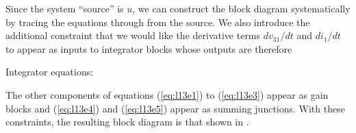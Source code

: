 \begin{slide}\label{slides:l13s1}
\begin{center}
\end{center}
\end{slide}


\ifslidesonly
\begin{slide}\label{opteq:l13e1a}

\end{slide}
\fi


Since the system ``source'' is $u$, we can construct the block diagram
systematically by tracing the equations through from the source. We
also introduce the additional constraint that we would like the derivative terms
$dv_{31}/dt$ and $di_1/dt$ to
appear as inputs to integrator blocks whose outputs are therefore
\ifslidesonly
\begin{slide}\label{opteq:l13e1b}
Integrator equations:

\end{slide}
\fi
The other
components of equations (\ref{eq:l13e1}) to (\ref{eq:l13e3}) appear as
gain blocks and (\ref{eq:l13e4}) and (\ref{eq:l13e5}) appear as summing
junctions.  With these constraints, the resulting block diagram is
that shown in .

